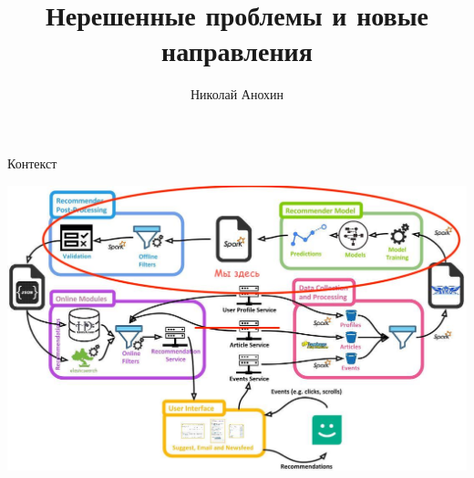 \documentclass[11pt,aspectratio=169]{beamer}
\author{Николай Анохин}
\title{Нерешенные проблемы и новые направления}
\begin{document}
{

\begin{frame}
\titlepage
\end{frame}


}

\begin{frame}{Контекст}

\begin{center}
\includegraphics[scale=0.23]{images/mendeley.jpeg}
\end{center}

\end{frame}
\end{document}
